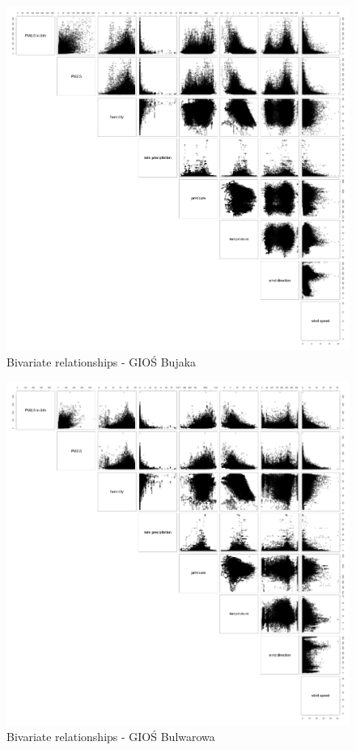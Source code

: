 \begin{landscape}
\begin{figure}[htp]
\centering
  \centering
  \includegraphics[width=0.65\linewidth]{figures/dataset/bivariate/relationships_gios_bujaka.png}
  \caption{Bivariate relationships - GIOŚ Bujaka}
  \label{fig:dataset-bivariate-bujaka}
\end{figure}
\end{landscape}
\begin{landscape}
\begin{figure}[htp]
\centering
  \centering
    \includegraphics[width=0.65\linewidth]{figures/dataset/bivariate/relationships_gios_bulwarowa.png}
    \caption{Bivariate relationships - GIOŚ Bulwarowa}
    \label{fig:dataset-bivariate-bulwarowa}
\end{figure}
\end{landscape}
